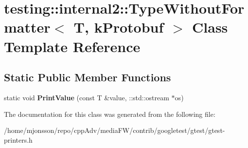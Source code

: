 \hypertarget{classtesting_1_1internal2_1_1TypeWithoutFormatter_3_01T_00_01kProtobuf_01_4}{}\section{testing\+:\+:internal2\+:\+:Type\+Without\+Formatter$<$ T, k\+Protobuf $>$ Class Template Reference}
\label{classtesting_1_1internal2_1_1TypeWithoutFormatter_3_01T_00_01kProtobuf_01_4}
\subsection*{Static Public Member Functions}
\begin{DoxyCompactItemize}
\item 
\mbox{\label{classtesting_1_1internal2_1_1TypeWithoutFormatter_3_01T_00_01kProtobuf_01_4_ac96fb775dc776f02da9a671ea0e04599}} 
static void {\bfseries Print\+Value} (const T \&value, \+::std\+::ostream $\ast$os)
\end{DoxyCompactItemize}


The documentation for this class was generated from the following file\+:\begin{DoxyCompactItemize}
\item 
/home/mjonsson/repo/cpp\+Adv/media\+F\+W/contrib/googletest/gtest/gtest-\/printers.\+h\end{DoxyCompactItemize}
